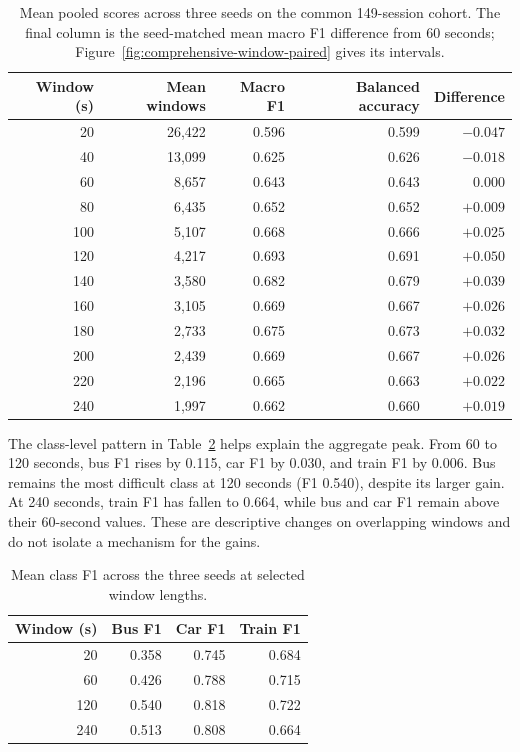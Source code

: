 \begin{table}[htbp]
\centering
\small
\caption{Mean pooled scores across three seeds on the common 149-session
cohort. The final column is the seed-matched mean macro F1 difference from
60 seconds; Figure~\ref{fig:comprehensive-window-paired} gives its intervals.}
\label{tab:comprehensive-window-grid}
\begin{tabular}{rrrrr}
\hline
Window (s) & Mean windows & Macro F1 & Balanced accuracy & Difference \\
\hline
20  & 26,422 & 0.596 & 0.599 & $-0.047$ \\
40  & 13,099 & 0.625 & 0.626 & $-0.018$ \\
60  & 8,657  & 0.643 & 0.643 & $0.000$ \\
80  & 6,435  & 0.652 & 0.652 & $+0.009$ \\
100 & 5,107  & 0.668 & 0.666 & $+0.025$ \\
120 & 4,217  & 0.693 & 0.691 & $+0.050$ \\
140 & 3,580  & 0.682 & 0.679 & $+0.039$ \\
160 & 3,105  & 0.669 & 0.667 & $+0.026$ \\
180 & 2,733  & 0.675 & 0.673 & $+0.032$ \\
200 & 2,439  & 0.669 & 0.667 & $+0.026$ \\
220 & 2,196  & 0.665 & 0.663 & $+0.022$ \\
240 & 1,997  & 0.662 & 0.660 & $+0.019$ \\
\hline
\end{tabular}
\end{table}

The class-level pattern in Table~\ref{tab:comprehensive-window-classes}
helps explain the aggregate peak. From 60 to 120 seconds, bus F1 rises by
0.115, car F1 by 0.030, and train F1 by 0.006. Bus remains the most difficult
class at 120 seconds (F1 0.540), despite its larger gain. At 240 seconds,
train F1 has fallen to 0.664, while bus and car F1 remain above their
60-second values. These are descriptive changes on overlapping windows and
do not isolate a mechanism for the gains.

\begin{table}[htbp]
\centering
\small
\caption{Mean class F1 across the three seeds at selected window lengths.}
\label{tab:comprehensive-window-classes}
\begin{tabular}{rrrr}
\hline
Window (s) & Bus F1 & Car F1 & Train F1 \\
\hline
20  & 0.358 & 0.745 & 0.684 \\
60  & 0.426 & 0.788 & 0.715 \\
120 & 0.540 & 0.818 & 0.722 \\
240 & 0.513 & 0.808 & 0.664 \\
\hline
\end{tabular}
\end{table}

